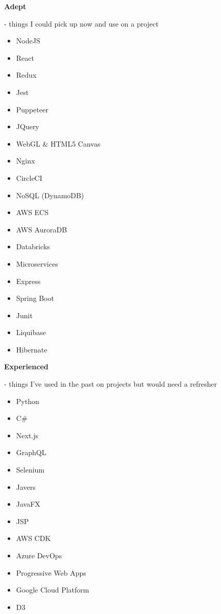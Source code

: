 \documentclass[hidelinks, 12pt, a4paper]{article}
\begin{document}
	\vspace{8pt}
		
	\begin{large}
		\textbf{Adept}
	\end{large}- things I could pick up now and use on a project

	\begin{multicols}{4}
		\begin{itemize}
			\item NodeJS
			\item React
			\item Redux
			\item Jest
			\item Puppeteer
			
			\item JQuery
			\item WebGL \& HTML5 Canvas
			\item Nginx
			\item CircleCI
			
			
			\item NoSQL (DynamoDB)
			\item AWS ECS
			\item AWS AuroraDB
			\item Databricks
			\item Microservices
			
			
			\item Express
			\item Spring Boot
			\item Junit
			\item Liquibase
			\item Hibernate			
		\end{itemize}
	\end{multicols}

	\vspace{8pt}
		
	\begin{large}
		\textbf{Experienced}
	\end{large}- things I've used in the past on projects but would need a refresher

	\begin{multicols}{5}
		\begin{itemize}
			\item Python
			\item C\#
			\item Next.js
			\item GraphQL
			
			\item Selenium
			\item Javers
			\item JavaFX
			\item JSP
			
			\item AWS CDK
			\item Azure DevOps
			\item Progressive Web Apps
			
			\item Google Cloud Platform
			\item D3
		\end{itemize}
	\end{multicols}
\end{document}
